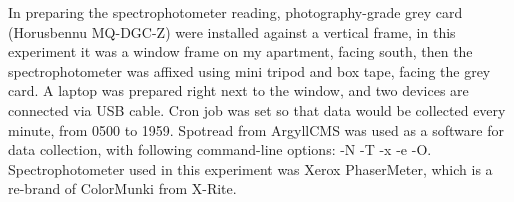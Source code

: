 In preparing the spectrophotometer reading, photography-grade grey card (Horusbennu MQ-DGC-Z) were installed against a vertical frame, in this experiment it was a window frame on my apartment, facing south, then the spectrophotometer was affixed using mini tripod and box tape, facing the grey card. A laptop was prepared right next to the window, and two devices are connected via USB cable. Cron job was set so that data would be collected every minute, from 0500 to 1959. Spotread from ArgyllCMS was used as a software for data collection, with following command-line options: -N -T -x -e -O. Spectrophotometer used in this experiment was Xerox PhaserMeter, which is a re-brand of ColorMunki from X-Rite.
